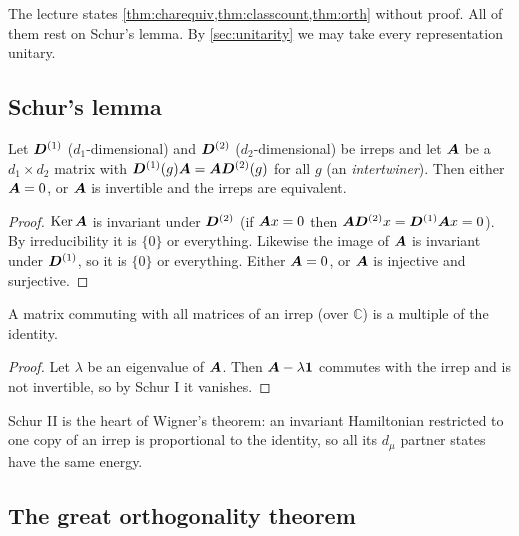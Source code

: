 The lecture states \cref{thm:charequiv,thm:classcount,thm:orth} without proof. All of
them rest on Schur's lemma. By \cref{sec:unitarity} we may take every representation
unitary.

\subsection{Schur's lemma}\label{sec:schur}

\begin{lemma}[Schur I]
Let $\bm{D}^{(1)}$ ($d_1$-dimensional) and $\bm{D}^{(2)}$ ($d_2$-dimensional) be irreps and
let $\bm{A}$ be a $d_1\times d_2$ matrix with
$\bm{D}^{(1)}(g)\bm{A}=\bm{A}\bm{D}^{(2)}(g)$ for all $g$ (an \emph{intertwiner}).
Then either $\bm{A}=0$, or $\bm{A}$ is invertible and the irreps are equivalent.
\end{lemma}
\begin{proof}
$\operatorname{Ker}\bm{A}$ is invariant under $\bm{D}^{(2)}$ (if $\bm{A}x=0$ then
$\bm{A}\bm{D}^{(2)}x=\bm{D}^{(1)}\bm{A}x=0$). By irreducibility it is $\{0\}$ or everything.
Likewise the image of $\bm{A}$ is invariant under $\bm{D}^{(1)}$, so it is $\{0\}$ or
everything. Either $\bm{A}=0$, or $\bm{A}$ is injective and surjective.
\end{proof}

\begin{lemma}[Schur II]
A matrix commuting with all matrices of an irrep (over $\mathbb{C}$) is a multiple of
the identity.
\end{lemma}
\begin{proof}
Let $\lambda$ be an eigenvalue of $\bm{A}$. Then $\bm{A}-\lambda\bm{1}$ commutes with the
irrep and is not invertible, so by Schur I it vanishes.
\end{proof}
Schur II is the heart of Wigner's theorem: an invariant Hamiltonian restricted to one
copy of an irrep is proportional to the identity, so all its $d_\mu$ partner states have
the same energy.

\subsection{The great orthogonality theorem}

